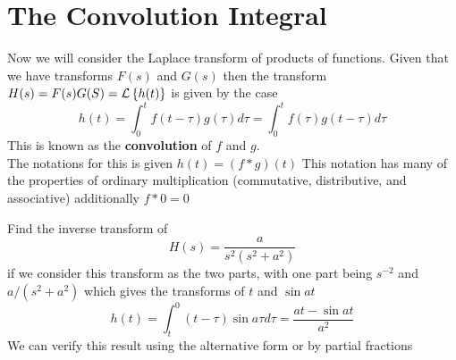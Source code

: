 \section{The Convolution Integral}
Now we will consider the Laplace transform of products of functions. Given that we have transforms $ F(s) $ and $ G(s) $ then the transform $ H(s) = F(s)G(S) = \mathcal{L} \left\{ h(t) \right\}$ is given by the case \[ h(t) = \int_{0}^{t} f(t-\tau) g(\tau) d\tau = \int_{0}^{t} f(\tau) g(t-\tau) d\tau \] This is known as the \textbf{convolution} of $ f $ and $ g $. \\
The notations for this is given $ h(t) = (f \ast g)(t) $ This notation has many of the properties of ordinary multiplication (commutative, distributive, and associative) additionally $ f \ast 0 = 0 $
\begin{example}
	Find the inverse transform of \[ H(s) = \dfrac{a}{s^2(s^2 + a^2)} \] if we consider this transform as the two parts, with one part being $ s^{-2} $ and $ a/(s^2 + a^2) $ which gives the transforms of $ t $ and $ \sin at $ 
	\[ h(t) = \int_{t}^{0}(t-\tau) \sin a \tau d \tau = \dfrac{at - \sin at}{a^2} \] We can verify this result using the alternative form or by partial fractions 
\end{example}

